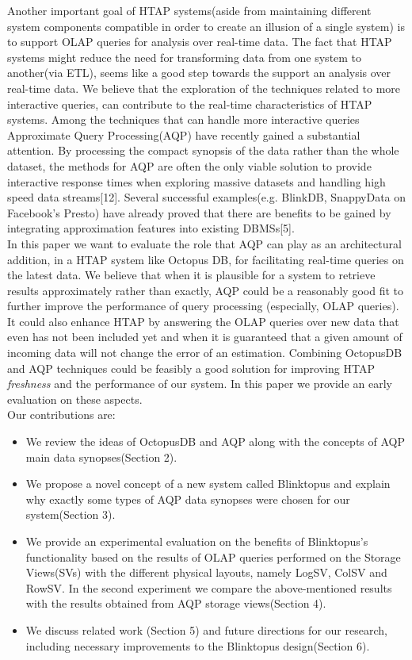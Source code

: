 \documentclass[10pt, conference, compsocconf]{IEEEtran}
\begin{document}
Another important goal of HTAP systems(aside from maintaining different system components compatible in order to create an illusion of a single system) is to support OLAP queries for analysis over real-time data. The fact that HTAP systems might reduce the need for transforming data from one system to another(via ETL), seems like a good step towards the support an analysis over real-time data. We believe that the exploration of the techniques related to more interactive queries, can contribute to the real-time characteristics of HTAP systems. Among the techniques that can handle more interactive queries Approximate Query Processing(AQP) have recently gained a substantial attention. By processing the compact synopsis of the data rather than the whole dataset, the methods for AQP are often the only viable solution to provide interactive response times when exploring massive datasets and handling high speed data streams[12]. Several successful examples(e.g. BlinkDB, SnappyData on Facebook's Presto) have already proved that there are benefits to be gained by integrating approximation features into existing DBMSs[5].\\
In this paper we want to evaluate the role that AQP can play as an architectural addition, in a HTAP system like Octopus DB, for facilitating real-time queries on the latest data. 
We believe that when it is plausible for a system to retrieve results approximately rather than exactly, AQP could be a reasonably good fit to further improve the performance of query processing (especially, OLAP queries). It could also enhance HTAP by answering the OLAP queries over new data that even has not been included yet and when it is guaranteed that a given amount of incoming data will not change the error of an estimation. Combining OctopusDB and AQP techniques could be feasibly a good solution for improving HTAP \textit{freshness} and the performance of our system. In this paper we provide an early evaluation on these aspects.\\

Our contributions are:
\begin{itemize}
\vspace{0.05 cm}
\item{We review the ideas of OctopusDB and AQP along with the concepts of AQP main data synopses(Section 2).}
\item{We propose a novel concept of a new system called Blinktopus and explain why exactly some types of AQP data synopses were chosen for our system(Section 3).}
\item{We provide an experimental evaluation on the benefits of Blinktopus's functionality based on the results of OLAP queries performed on the Storage Views(SVs) with the different physical layouts, namely LogSV, ColSV and RowSV. In the second experiment we compare the above-mentioned results with the results obtained from AQP storage views(Section 4).}
\item{We discuss related work (Section 5) and future directions for our research, including necessary improvements to the Blinktopus design(Section 6).}
\end{itemize}
\end{document}
